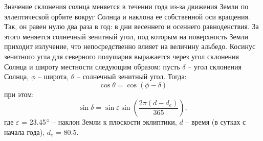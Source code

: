 \documentclass[a4paper, fontsize=14pt]{scrartcl}
\begin{document}
Значение склонения солнца меняется в течении года из-за движения Земли по эллептической орбите вокруг Солнца и наклона ее собственной оси вращения. Так, он равен нулю два раза в год: в дни весеннего и осеннего равноденствия. За этого меняется солнечный зенитный угол, под которым на поверхность Земли приходит излучение, что непосредственно влияет на величину альбедо. Косинус зенитного угла для северного полушария выражается через угол склонения Солнца и широту местности следующим образом: пусть $\delta$ – угол склонения Солнца, $\phi$ – широта, $\theta$ – солнечный зенитный угол. Тогда:
\begin{equation}
    \cos \theta = \cos ( \phi - \delta ) \label{sys}
\end{equation}
при этом:
\begin{equation}
    \sin \delta = \sin \varepsilon \sin \left(\dfrac{2 \pi (d - d_e)}{365} \right) ,  \label{sys}
\end{equation}
где $\varepsilon$ = 23.45$\degree$  – наклон Земли к плоскости эклиптики, $d$ – время (в сутках с начала года), $d_e$ = 80.5.
\end{document}
